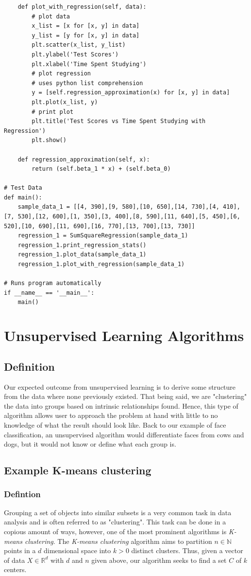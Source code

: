 \documentclass[12pt]{article}
\begin{document}
\begin{lstlisting}
	def plot_with_regression(self, data):
		# plot data
		x_list = [x for [x, y] in data]
		y_list = [y for [x, y] in data]
		plt.scatter(x_list, y_list)
		plt.ylabel('Test Scores')
		plt.xlabel('Time Spent Studying')
		# plot regression
		# uses python list comprehension
		y = [self.regression_approximation(x) for [x, y] in data]
		plt.plot(x_list, y)
		# print plot
		plt.title('Test Scores vs Time Spent Studying with Regression')
		plt.show()		

	def regression_approximation(self, x):
		return (self.beta_1 * x) + (self.beta_0)

# Test Data
def main():
	sample_data_1 = [[4, 390],[9, 580],[10, 650],[14, 730],[4, 410],[7, 530],[12, 600],[1, 350],[3, 400],[8, 590],[11, 640],[5, 450],[6, 520],[10, 690],[11, 690],[16, 770],[13, 700],[13, 730]]
	regression_1 = SumSquareRegression(sample_data_1)
	regression_1.print_regression_stats()
	regression_1.plot_data(sample_data_1)
	regression_1.plot_with_regression(sample_data_1)

# Runs program automatically
if __name__ == '__main__':
	main()
\end{lstlisting}
\section{Unsupervised Learning Algorithms}
\subsection{Definition}
Our expected outcome from unsupervised learning is to derive some structure from the data where none previously existed. That being said, we are "clustering" the data into groups based on intrinsic relationships found. Hence, this type of algorithm allows user to approach the problem at hand with little to no knowledge of what the result should look like. Back to our example of face classification, an unsupervised algorithm would differentiate faces from cows and dogs, but it would not know or define what each group is.  
\subsection{Example K-means clustering}
\subsubsection{Defintion}
Grouping a set of objects into similar subsets is a very common task in data analysis and is often referred to as "clustering". This task can be done in a copious amount of ways, however, one of the most prominent algorithms is \textit{K-means clustering}. The  \textit{K-means clustering} algorithm aims to partition $n \in \mathbb{N}$ points in a $d$ dimensional space into $k > 0$ distinct clusters. Thus, given a vector of data $X \in \mathbb{R}^d$ with $d$ and $n$ given above, our algorithm seeks to find a set $C$ of $k$ centers. \cite{MacKay} 
\end{document}
